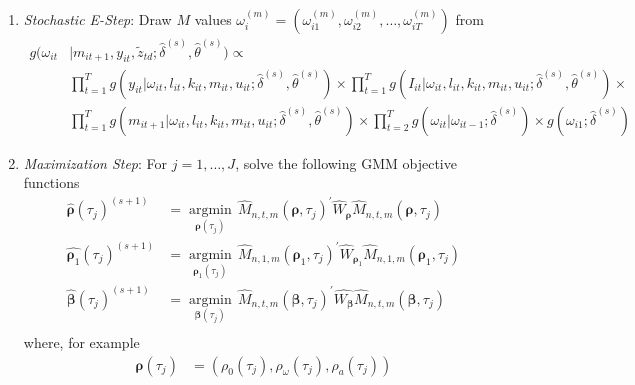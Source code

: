 \documentclass{article}
\begin{document}
\begin{enumerate}
    \item \textit{Stochastic E-Step}: Draw $M$ values $\omega_{i}^{(m)}=(\omega_{i1}^{(m)}, \omega_{i2}^{(m)},\dots, \omega_{iT}^{(m)})$ from
        \begin{equation*}
        \begin{split}
            g(\omega_{it}&|m_{it+1}, y_{it}, \tilde{z}_{td}; \hat{\delta}^{(s)},\hat{\theta}^{(s)}) \propto\\
            &\prod_{t=1}^{T}g(y_{it}|\omega_{it}, l_{it}, k_{it}, m_{it}, u_{it};\hat{\delta}^{(s)},\hat{\theta}^{(s)})\times
            \prod_{t=1}^{T}g(I_{it}|\omega_{it}, l_{it}, k_{it}, m_{it}, u_{it};\hat{\delta}^{(s)},\hat{\theta}^{(s)})\times\\
            &\prod_{t=1}^{T}g(m_{it+1}|\omega_{it}, l_{it}, k_{it}, m_{it}, u_{it};\hat{\delta}^{(s)},\hat{\theta}^{(s)})\times \prod_{t=2}^{T}g(\omega_{it}|\omega_{it-1};\hat{\delta}^{(s)})\times g(\omega_{i1};\hat{\delta}^{(s)})
            \end{split}
        \end{equation*}
    \item \textit{Maximization Step}: For $j=1,\dots, J$, solve the following GMM objective functions
    \begin{equation*}
    \begin{split}
    \hat{\boldsymbol\rho}(\tau_{j})^{(s+1)}&=\underset{\boldsymbol\rho(\tau_{j})}{\operatorname{argmin}}\,\hat{M}_{n,t,m}(\boldsymbol\rho, \tau_{j})^{'}\hat{W}_{\boldsymbol\rho}\hat{M}_{n,t,m}(\boldsymbol\rho, \tau_{j})\\
    \hat{\boldsymbol\rho_{1}}(\tau_{j})^{(s+1)}&=\underset{\boldsymbol\rho_{1}(\tau_{j})}{\operatorname{argmin}}\,\hat{M}_{n,1,m}(\boldsymbol\rho_{1}, \tau_{j})^{'}\hat{W}_{\boldsymbol\rho_{1}}\hat{M}_{n,1,m}(\boldsymbol\rho_{1}, \tau_{j})\\
    \hat{\boldsymbol\beta}(\tau_{j})^{(s+1)}&=\underset{\boldsymbol\beta(\tau_{j})}{\operatorname{argmin}}\,\hat{M}_{n,t,m}(\boldsymbol\beta, \tau_{j})^{'}\hat{W_{\boldsymbol\beta}}\hat{M}_{n,t,m}(\boldsymbol\beta, \tau_{j})\\
    \end{split}
    \end{equation*}
    where, for example
    \begin{equation*}
    \begin{split}
     \boldsymbol\rho(\tau_{j})&=(\rho_{0}(\tau_{j}), \rho_{\omega}(\tau_{j}), \rho_{a}(\tau_{j}))\\

\end{split}
\end{equation*}
\end{enumerate}
\end{document}
